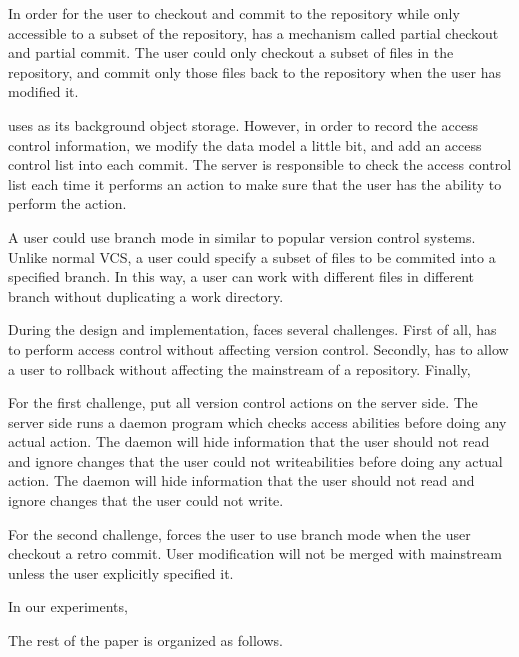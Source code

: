 In order for the user to checkout and commit to the repository while only
accessible to a subset of the repository, \sys has a mechanism called partial
checkout and partial commit. The user could only checkout a subset of files in
the repository, and commit only those files back to the repository when the user
has modified it.

\sys uses \git as its background object storage. However, in order to record the
access control information, we modify the data model a little bit, and add an
access control list into each commit. The server is responsible to check the
access control list each time it performs an action to make sure that the user
has the ability to perform the action.


A user could use branch mode in \sys similar to popular version control systems.
Unlike normal VCS, a user could specify a subset of files to be commited into a
specified branch. In this way, a user can work with different files in different
branch without duplicating a work directory. 


During the design and implementation, \sys faces several challenges. First of
all, \sys has to perform access control without affecting version control.
Secondly, \sys has to allow a user to rollback without affecting the mainstream
of a repository. Finally, 

For the first challenge, \sys put all version control actions on the server
side. The server side runs a daemon program which checks access abilities before
doing any actual action. The daemon will hide information that the user should
not read and ignore changes that the user could not writeabilities before doing
any actual action. The daemon will hide information that the user should not
read and ignore changes that the user could not write.

For the second challenge, \sys forces the user to use branch mode when the user
checkout a retro commit. User modification
will not be merged with mainstream unless the user explicitly
specified it.


In our experiments, 


The rest of the paper is organized as follows. 

